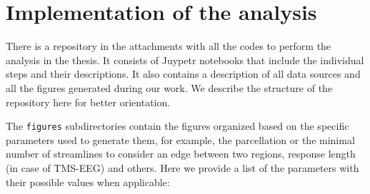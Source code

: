 \chapter{Implementation of the analysis}

There is a repository in the attachments with all the codes to perform the analysis in the thesis. It consists of Juypetr notebooks that include the individual steps and their descriptions. It also contains a description of all data sources and all the figures generated during our work. We describe the structure of the repository here for better orientation. 

\bigskip


\bigskip

The \texttt{figures} subdirectories contain the figures organized based on the specific parameters used to generate them, for example, the parcellation or the minimal number of streamlines to consider an edge between two regions, response length (in case of TMS-EEG) and others. Here we provide a list of the parameters with their possible values when applicable:

